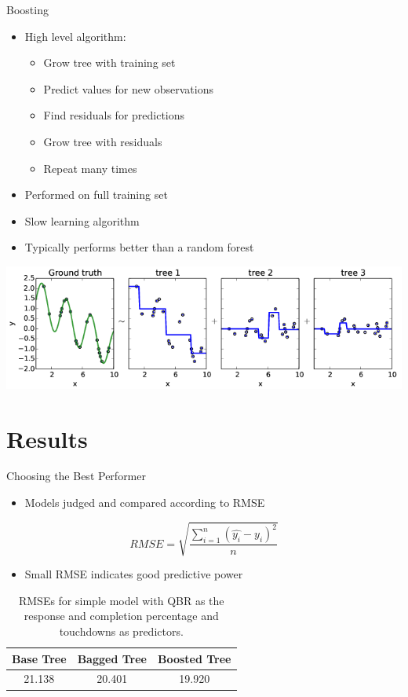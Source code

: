 \documentclass{beamer}
\begin{document}
	\begin{frame}{Boosting}
		\begin{itemize}
			\item High level algorithm:
			\begin{itemize}
				\item Grow tree with training set
				\item Predict values for new observations
				\item Find residuals for predictions
				\item Grow tree with residuals
				\item Repeat many times
			\end{itemize}
			\item Performed on full training set
			\item Slow learning algorithm
			\item Typically performs better than a random forest
		\end{itemize}
		\includegraphics[scale=.4]{boostingex.png}
	\end{frame}
	
	\section{Results}
	
	\begin{frame}{Choosing the Best Performer}
		\begin{itemize}
			\item Models judged and compared according to RMSE
		\end{itemize}
		\begin{equation}
			RMSE=\sqrt{\frac{\sum_{i=1}^{n}(\hat{y_{i}}-y_{i})^{2}}{n}}
		\end{equation}		
		\begin{itemize}
			\item Small RMSE indicates good predictive power
		\end{itemize}
		\begin{table}
			\centering
			\begin{tabular}{|c|c|c|}
				\hline
				Base Tree & Bagged Tree & Boosted Tree\\
				\hline
				21.138 & 20.401 & 19.920\\
				\hline
			\end{tabular}
		\caption{RMSEs for simple model with QBR as the response and completion percentage and touchdowns as predictors.}
		\end{table}
	\end{frame}
\end{document}
